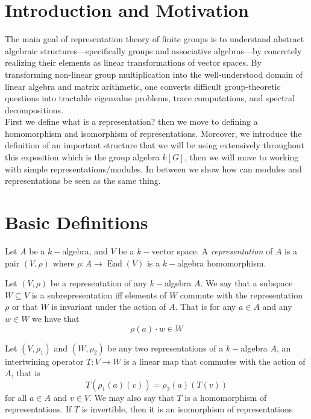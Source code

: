 \section{Introduction and Motivation}
The main goal of representation theory of finite groups is to understand abstract algebraic structures—specifically groups and associative algebras—by concretely realizing their elements as linear transformations of vector spaces. By transforming non-linear group multiplication into the well-understood domain of linear algebra and matrix arithmetic, one converts difficult group-theoretic questions into tractable eigenvalue problems, trace computations, and spectral decompositions.
\\
First we define what is a representation? then we move to defining a homomorphism and isomorphism of representations. Moreover, we introduce the definition of an important structure that we will be using extensively throughout this exposition which is the group algebra $k[G]$, then we will move to working with simple representations/modules. In between we show how can modules and representations be seen as the same thing.

\section{Basic Definitions}

\begin{definition}\label{Def 2.1}
    Let $A$ be a $k-$algebra, and $V$ be a $k-$vector space. A \emph{representation} of $A$ is a pair $(V,\rho)$ where $\rho: A \to \operatorname{End}(V)$ is a $k-$algebra homomorphism.
\end{definition}
\begin{definition}[Subrepresentation]
    
    Let $(V, \rho)$ be a representation of any $k-$algebra $A$. We say that a subspace $W \subseteq V$ is a subrepresentation iff elements of $W$ commute with the representation $\rho$ or that $W$ is invariant under the action of $A$. That is for any $a \in A$ and any $w \in W$ we have that 
    \[
        \rho(a) \cdot w \in W
    \]
    
\end{definition}

\begin{definition}
    Let $(V, \rho_1)$ and $(W, \rho_2)$ be any two representations of a $k-$algebra $A$, an intertwining operator $T:V \to W$ is a linear map that commutes with the action of $A$, that is
    \[
       T(\rho_1(a)(v)) = \rho_2(a)(T(v))
    \]
    for all $a \in A $ and $v \in V$.
    We may also say that $T$ is a homomorphism of representations. If $T$ is invertible, then it is an isomorphism of representations
\end{definition}

